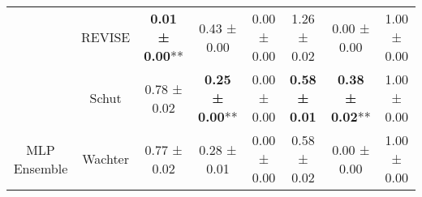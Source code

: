 \begin{table}
{\begin{tabular}[t]{cccccccc}
 & REVISE & \textbf{0.01 ± 0.00}** & 0.43 ± 0.00\hphantom{*}\hphantom{*} & 0.00 ± 0.00\hphantom{*}\hphantom{*} & 1.26 ± 0.02\hphantom{*}\hphantom{*} & 0.00 ± 0.00\hphantom{*}\hphantom{*} & 1.00 ± 0.00\hphantom{*}\hphantom{*}\\

 & Schut & 0.78 ± 0.02\hphantom{*}\hphantom{*} & \textbf{0.25 ± 0.00}** & 0.00 ± 0.00\hphantom{*}\hphantom{*} & \textbf{0.58 ± 0.01}\hphantom{*}\hphantom{*} & \textbf{0.38 ± 0.02}** & 1.00 ± 0.00\hphantom{*}\hphantom{*}\\

\multirow[t]{-9}{*}{\centering\arraybackslash MLP Ensemble} & Wachter & 0.77 ± 0.02\hphantom{*}\hphantom{*} & 0.28 ± 0.01\hphantom{*}\hphantom{*} & 0.00 ± 0.00\hphantom{*}\hphantom{*} & 0.58 ± 0.02\hphantom{*}\hphantom{*} & 0.00 ± 0.00\hphantom{*}\hphantom{*} & 1.00 ± 0.00\hphantom{*}\hphantom{*}\\
\bottomrule
\end{tabular}}
\end{table}
